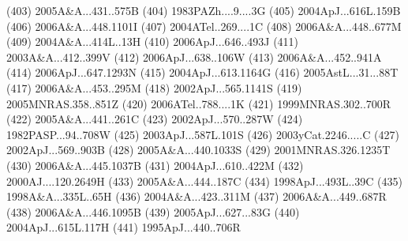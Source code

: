 (403) 2005A\&A...431..575B
(404) 1983PAZh....9....3G
(405) 2004ApJ...616L.159B
(406) 2006A\&A...448.1101I
(407) 2004ATel..269....1C
(408) 2006A\&A...448..677M
(409) 2004A\&A...414L..13H
(410) 2006ApJ...646..493J
(411) 2003A\&A...412..399V
(412) 2006ApJ...638..106W
(413) 2006A\&A...452..941A
(414) 2006ApJ...647.1293N
(415) 2004ApJ...613.1164G
(416) 2005AstL...31...88T
(417) 2006A\&A...453..295M
(418) 2002ApJ...565.1141S
(419) 2005MNRAS.358..851Z
(420) 2006ATel..788....1K
(421) 1999MNRAS.302..700R
(422) 2005A\&A...441..261C
(423) 2002ApJ...570..287W
(424) 1982PASP...94..708W
(425) 2003ApJ...587L.101S
(426) 2003yCat.2246.....C
(427) 2002ApJ...569..903B
(428) 2005A\&A...440.1033S
(429) 2001MNRAS.326.1235T
(430) 2006A\&A...445.1037B
(431) 2004ApJ...610..422M
(432) 2000AJ....120.2649H
(433) 2005A\&A...444..187C
(434) 1998ApJ...493L..39C
(435) 1998A\&A...335L..65H
(436) 2004A\&A...423..311M
(437) 2006A\&A...449..687R
(438) 2006A\&A...446.1095B
(439) 2005ApJ...627...83G
(440) 2004ApJ...615L.117H
(441) 1995ApJ...440..706R
